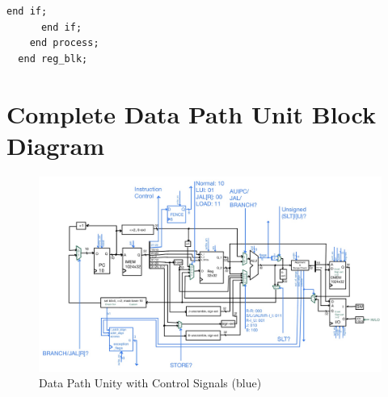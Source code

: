 \documentclass[lettersize,journal]{IEEEtran}
\begin{document}
{\begin{Verbatim}[breaklines]
        end if;
      end if;
    end process;
  end reg_blk;
\end{Verbatim}
\section*{Complete Data Path Unit Block Diagram}
\begin{figure}[!h]
  \label{fig:dpu}
  \centering
  \includegraphics[width=16cm, angle=270]{DPU.jpg}
  \caption{Data Path Unity with Control Signals (blue)}
\end{figure}}

\nocite{*}

\end{document}
